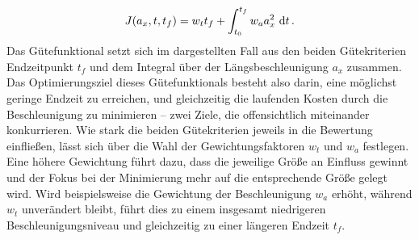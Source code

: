 \begin{equation}
J(a_x,t,t_f) = w_t t_f + \int_{t_0}^{t_f}w_a a_x^2~\textrm{d}{t}\,. \label{eq:Bsp_Gütefunktional}
\end{equation}
Das Gütefunktional setzt sich im dargestellten Fall aus den beiden Gütekriterien Endzeitpunkt $t_f$ und dem Integral über der Längsbeschleunigung $a_x$ zusammen. Das Optimierungsziel dieses Gütefunktionals besteht also darin, eine möglichst geringe Endzeit zu erreichen, und gleichzeitig die laufenden Kosten durch die Beschleunigung zu minimieren -- zwei Ziele, die offensichtlich miteinander konkurrieren. Wie stark die beiden Gütekriterien jeweils in die Bewertung einfließen, lässt sich über die Wahl der Gewichtungsfaktoren $w_t$ und $w_a$ festlegen. Eine höhere Gewichtung führt dazu, dass die jeweilige Größe an Einfluss gewinnt und der Fokus bei der Minimierung mehr auf die entsprechende Größe gelegt wird. Wird beispielsweise die Gewichtung der Beschleunigung $w_a$ erhöht, während $w_t$ unverändert bleibt, führt dies zu einem insgesamt niedrigeren Beschleunigungsniveau und gleichzeitig zu einer längeren Endzeit $t_f$.
